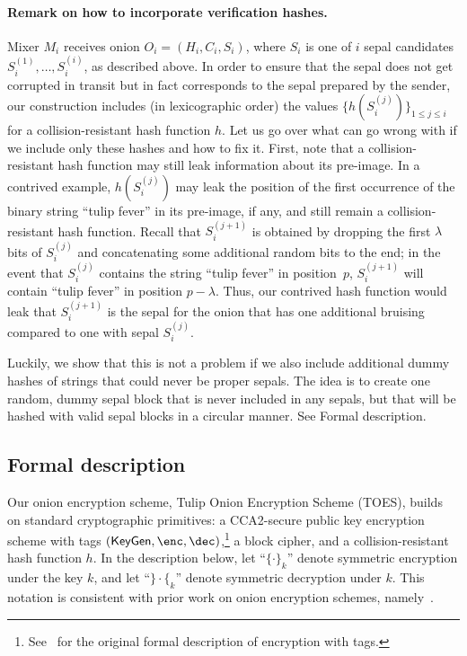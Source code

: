 \documentclass[runningheads,a4paper]{llncs}
\begin{document}
\paragraph{Remark on how to incorporate verification hashes.}  Mixer $M_i$ receives onion $O_i = (H_i,C_i,S_i)$, where $S_i$ is one of $i$ sepal candidates $S_i^{(1)},\ldots,S_i^{(i)}$, as described above.  In order to ensure that the sepal does not get corrupted in transit but in fact corresponds to the sepal prepared by the sender, our construction includes (in lexicographic order) the values $\{h(S_i^{(j)})\}_{1\leq j \leq i}$ for a collision-resistant hash function $h$.  Let us go over what can go wrong with if we include only these hashes and how to fix it.
%
First, note that a collision-resistant hash function may still leak information about its pre-image.  In a contrived example, $h(S_i^{(j)})$ may leak the position of the first occurrence of the binary string ``tulip fever'' in its pre-image, if any, and still remain a collision-resistant hash function.  Recall that $S_i^{(j+1)}$ is obtained by dropping the first $\lambda$ bits of $S_i^{(j)}$ and concatenating some additional random bits to the end; in the event that $S_i^{(j)}$ contains the string ``tulip fever'' in position~$p$, $S_i^{(j+1)}$ will contain ``tulip fever'' in position $p-\lambda$.
Thus, our contrived hash function would leak that $S_i^{(j+1)}$ is the sepal for the onion that has one additional bruising compared to one with sepal $S_i^{(j)}$.  

Luckily, we show that this is not a problem if we also include additional dummy hashes of strings that could never be proper sepals.  The idea is to create one random, dummy sepal block that is never included in any sepals, but that will be hashed with valid sepal blocks in a circular manner. See Formal description. %

\subsection{Formal description}\label{sec:formonion}
\newcommand{\share}{\mathsf{Share}}
\newcommand{\recon}{\mathsf{Recon}}
Our onion encryption scheme, Tulip Onion Encryption Scheme (TOES), builds on standard cryptographic primitives: 
a CCA2-secure public key encryption scheme with tags $(\keygen, \enc, \dec)$,\footnote{See~\cite{C:CraSho98} for the original formal description of encryption with tags.} 
a block cipher, and 
a collision-resistant hash function $h$. 
In the description below, let ``$\{\cdot\}_{k}$'' denote symmetric encryption under the key $k$, and let ``$\}\cdot\{_{k}$'' denote symmetric decryption under $k$. This notation is consistent with prior work on onion encryption schemes, namely~\cite{C:CamLys05, TCC:AndLys21, TCC:ACLM22}. 
\end{document}
